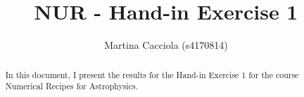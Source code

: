 \documentclass[a4paper,10pt]{article}
\title{NUR - Hand-in Exercise 1}
\author{Martina Cacciola (s4170814)}
\begin{document}
\maketitle

\begin{abstract}
 In this document, I present the results for the Hand-in Exercise 1 for the 
 course Numerical Recipes for Astrophysics.
\end{abstract}



\end{document}

